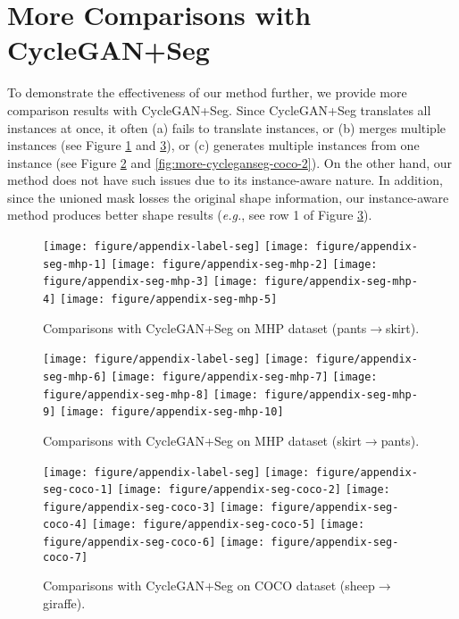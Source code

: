 \documentclass{article} \usepackage{iclr2019_conference,times}
\begin{document}
\newpage
\section{More Comparisons with CycleGAN+Seg}
\label{sec:more-comparison}
To demonstrate the effectiveness of our method further,
we provide more comparison results with CycleGAN+Seg. Since CycleGAN+Seg translates all instances at once, it often
(a) fails to translate instances, or (b) merges multiple instances
(see Figure \ref{fig:more-cycleganseg-mhp-1} and \ref{fig:more-cycleganseg-coco-1}),
or (c) generates multiple instances from one instance
(see Figure \ref{fig:more-cycleganseg-mhp-2} and \ref{fig:more-cycleganseg-coco-2}).
On the other hand, our method does not have such issues due to its instance-aware nature.
In addition, since the unioned mask losses the original shape information,
our instance-aware method produces better shape results
(\textit{e.g.}, see row 1 of Figure \ref{fig:more-cycleganseg-coco-1}).

\begin{figure}[h]
	\centering
	\texttt{[image: figure/appendix-label-seg]}
	\texttt{[image: figure/appendix-seg-mhp-1]}
	\texttt{[image: figure/appendix-seg-mhp-2]}
	\texttt{[image: figure/appendix-seg-mhp-3]}
	\texttt{[image: figure/appendix-seg-mhp-4]}
	\texttt{[image: figure/appendix-seg-mhp-5]}
	\caption{
	Comparisons with CycleGAN+Seg on MHP dataset (pants$\to$skirt).
	} \label{fig:more-cycleganseg-mhp-1}
\end{figure}

\begin{figure}[H]
	\centering
	\texttt{[image: figure/appendix-label-seg]}
	\texttt{[image: figure/appendix-seg-mhp-6]}
	\texttt{[image: figure/appendix-seg-mhp-7]}
	\texttt{[image: figure/appendix-seg-mhp-8]}
	\texttt{[image: figure/appendix-seg-mhp-9]}
	\texttt{[image: figure/appendix-seg-mhp-10]}
	\caption{
	Comparisons with CycleGAN+Seg on MHP dataset (skirt$\to$pants).
	} \label{fig:more-cycleganseg-mhp-2}
\end{figure}

\begin{figure}[H]
	\centering
	\texttt{[image: figure/appendix-label-seg]}
	\texttt{[image: figure/appendix-seg-coco-1]}
    \texttt{[image: figure/appendix-seg-coco-2]}
    \texttt{[image: figure/appendix-seg-coco-3]}
    \texttt{[image: figure/appendix-seg-coco-4]}
    \texttt{[image: figure/appendix-seg-coco-5]}
    \texttt{[image: figure/appendix-seg-coco-6]}
    \texttt{[image: figure/appendix-seg-coco-7]}
	\caption{
	Comparisons with CycleGAN+Seg on COCO dataset (sheep$\to$giraffe).
	} \label{fig:more-cycleganseg-coco-1}
\end{figure}
\end{document}

